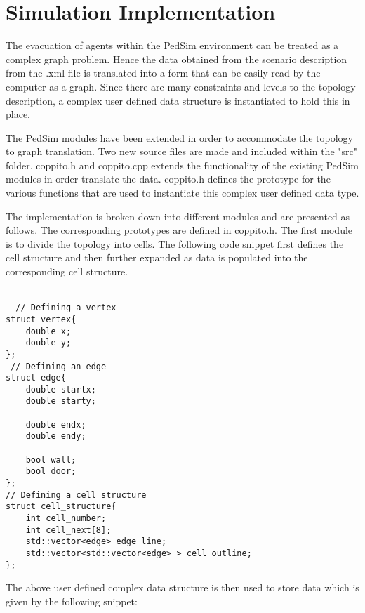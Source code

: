 \chapter{Simulation Implementation\label{ch:Simulation Implementation}}

The evacuation of agents within the PedSim environment can be treated as a complex graph problem. Hence the data obtained from the scenario description from the .xml file is translated into a form that can be easily read by the computer as a graph. Since there are many constraints and levels to the topology description, a complex user defined data structure is instantiated to hold this in place.

The PedSim modules have been extended in order to accommodate the topology to graph translation. Two new source files are made and included within the "src" folder. coppito.h and coppito.cpp extends the functionality of the existing PedSim modules in order translate the data. coppito.h defines the prototype for the various functions that are used to instantiate this complex user defined data type.

The implementation is broken down into different modules and are presented as follows. The corresponding prototypes are defined in coppito.h. The first module is to divide the topology into cells. The following code snippet first defines the cell structure and then further expanded as data is populated into the corresponding cell structure. \\ \\

\begin{lstlisting}
  // Defining a vertex
struct vertex{
	double x;
	double y;
};
 // Defining an edge
struct edge{
	double startx;
	double starty;

	double endx;
	double endy;

	bool wall;
	bool door;
};
// Defining a cell structure
struct cell_structure{
	int cell_number;
	int cell_next[8];
	std::vector<edge> edge_line;
	std::vector<std::vector<edge> > cell_outline;
};
\end{lstlisting}               

The above user defined complex data structure is then used to store data which is given by the following snippet:

